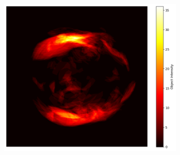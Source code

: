 \begin{figure}[h!]
\begin{subfigure}{0.33\textwidth}
        \caption{}
        \label{fig:fold1}
    \end{subfigure}\hfil
    \begin{subfigure}{0.33\textwidth}
        \includegraphics[width=\linewidth]{Images/chapter2/fold2_heatmap.png}
        \caption{}
        \label{fig:fold2}
    \end{subfigure}

    \vspace{1em} %


\end{figure}
